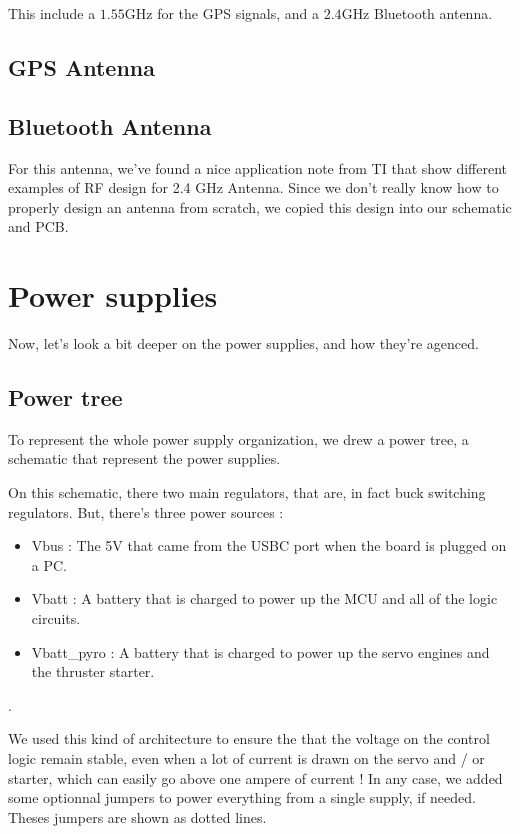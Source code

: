 This include a $1.55 \si{\giga\hertz}$ for the GPS signals, and a $2.4 \si{\giga\hertz}$ 
Bluetooth antenna.

\subsection{GPS Antenna}

\subsection{Bluetooth Antenna}
For this antenna, we've found a nice application note from TI \cite{InvertedF} that 
show different examples of RF design for 2.4 GHz Antenna. 
Since we don't really know how to properly design an antenna from scratch, we copied this
design into our schematic and PCB.

\section{Power supplies}
Now, let's look a bit deeper on the power supplies, and how they're agenced. 
\subsection{Power tree}
To represent the whole power supply organization, we drew a power tree, a schematic that
represent the power supplies.


On this schematic, there two main regulators, that are, in fact buck switching regulators.
But, there's three power sources : 
\begin{itemize}
    \item   Vbus : The 5V that came from the USBC port when the board is plugged on a PC.
    \item   Vbatt : A battery that is charged to power up the MCU and all of the logic circuits.
    \item   Vbatt\_pyro : A battery that is charged to power up the servo engines and the thruster starter.
\end{itemize}.

We used this kind of architecture to ensure the that the voltage on the control logic remain stable, even when 
a lot of current is drawn on the servo and / or starter, which can easily go above one ampere of current !
In any case, we added some optionnal jumpers to power everything from a single supply, if needed. Theses jumpers
are shown as dotted lines.

